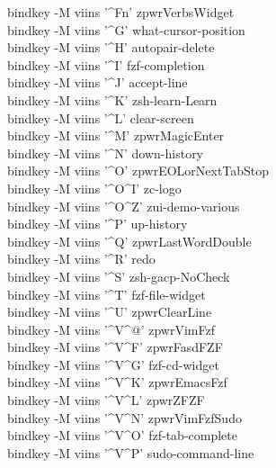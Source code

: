\documentclass[11pt,a4paper,twoside]{book}
\begin{document}
bindkey -M viins '\textasciicircum{}Fn' zpwrVerbsWidget\\
bindkey -M viins '\textasciicircum{}G' what-cursor-position\\
bindkey -M viins '\textasciicircum{}H' autopair-delete\\
bindkey -M viins '\textasciicircum{}I' fzf-completion\\
bindkey -M viins '\textasciicircum{}J' accept-line\\
bindkey -M viins '\textasciicircum{}K' zsh-learn-Learn\\
bindkey -M viins '\textasciicircum{}L' clear-screen\\
bindkey -M viins '\textasciicircum{}M' zpwrMagicEnter\\
bindkey -M viins '\textasciicircum{}N' down-history\\
bindkey -M viins '\textasciicircum{}O' zpwrEOLorNextTabStop\\
bindkey -M viins '\textasciicircum{}O\textasciicircum{}I' zc-logo\\
bindkey -M viins '\textasciicircum{}O\textasciicircum{}Z' zui-demo-various\\
bindkey -M viins '\textasciicircum{}P' up-history\\
bindkey -M viins '\textasciicircum{}Q' zpwrLastWordDouble\\
bindkey -M viins '\textasciicircum{}R' redo\\
bindkey -M viins '\textasciicircum{}S' zsh-gacp-NoCheck\\
bindkey -M viins '\textasciicircum{}T' fzf-file-widget\\
bindkey -M viins '\textasciicircum{}U' zpwrClearLine\\
bindkey -M viins '\textasciicircum{}V\textasciicircum{}@' zpwrVimFzf\\
bindkey -M viins '\textasciicircum{}V\textasciicircum{}F' zpwrFasdFZF\\
bindkey -M viins '\textasciicircum{}V\textasciicircum{}G' fzf-cd-widget\\
bindkey -M viins '\textasciicircum{}V\textasciicircum{}K' zpwrEmacsFzf\\
bindkey -M viins '\textasciicircum{}V\textasciicircum{}L' zpwrZFZF\\
bindkey -M viins '\textasciicircum{}V\textasciicircum{}N' zpwrVimFzfSudo\\
bindkey -M viins '\textasciicircum{}V\textasciicircum{}O' fzf-tab-complete\\
bindkey -M viins '\textasciicircum{}V\textasciicircum{}P' sudo-command-line\\
\end{document}
